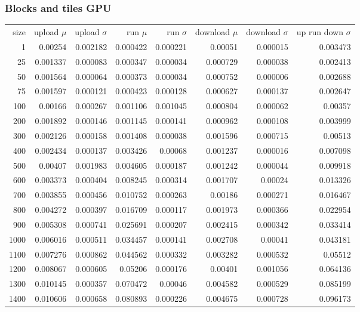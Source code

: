 \subsubsection{Blocks and tiles GPU}

\begin{longtable}{r r r r r r r r}
size & upload $\mu$  & upload $\sigma$ & run $\mu$ & run $\sigma$ & download $\mu$ & download $\sigma$ & up run down $\sigma$ \\
1 & 0.00254 & 0.002182 & 0.000422 & 0.000221 & 0.00051 & 0.000015 & 0.003473 \\
25 & 0.001337 & 0.000083 & 0.000347 & 0.000034 & 0.000729 & 0.000038 & 0.002413 \\
50 & 0.001564 & 0.000064 & 0.000373 & 0.000034 & 0.000752 & 0.000006 & 0.002688 \\
75 & 0.001597 & 0.000121 & 0.000423 & 0.000128 & 0.000627 & 0.000137 & 0.002647 \\
100 & 0.00166 & 0.000267 & 0.001106 & 0.001045 & 0.000804 & 0.000062 & 0.00357 \\
200 & 0.001892 & 0.000146 & 0.001145 & 0.000141 & 0.000962 & 0.000108 & 0.003999 \\
300 & 0.002126 & 0.000158 & 0.001408 & 0.000038 & 0.001596 & 0.000715 & 0.00513 \\
400 & 0.002434 & 0.000137 & 0.003426 & 0.00068 & 0.001237 & 0.000016 & 0.007098 \\
500 & 0.00407 & 0.001983 & 0.004605 & 0.000187 & 0.001242 & 0.000044 & 0.009918 \\
600 & 0.003373 & 0.000404 & 0.008245 & 0.000314 & 0.001707 & 0.00024 & 0.013326 \\
700 & 0.003855 & 0.000456 & 0.010752 & 0.000263 & 0.00186 & 0.000271 & 0.016467 \\
800 & 0.004272 & 0.000397 & 0.016709 & 0.000117 & 0.001973 & 0.000366 & 0.022954 \\
900 & 0.005308 & 0.000741 & 0.025691 & 0.000207 & 0.002415 & 0.000342 & 0.033414 \\
1000 & 0.006016 & 0.000511 & 0.034457 & 0.000141 & 0.002708 & 0.00041 & 0.043181 \\
1100 & 0.007276 & 0.000862 & 0.044562 & 0.000332 & 0.003282 & 0.000532 & 0.05512 \\
1200 & 0.008067 & 0.000605 & 0.05206 & 0.000176 & 0.00401 & 0.001056 & 0.064136 \\
1300 & 0.010145 & 0.000357 & 0.070472 & 0.00046 & 0.004582 & 0.000529 & 0.085199 \\
1400 & 0.010606 & 0.000658 & 0.080893 & 0.000226 & 0.004675 & 0.000728 & 0.096173 \\

\end{longtable}
